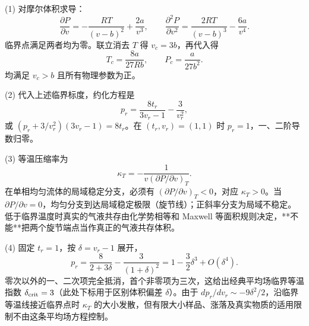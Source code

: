 (1) 对摩尔体积求导：
\[
\frac{\partial P}{\partial v}=-\frac{RT}{(v-b)^2}+\frac{2a}{v^3},\qquad
\frac{\partial^2P}{\partial v^2}=\frac{2RT}{(v-b)^3}-\frac{6a}{v^4}.
\]
临界点满足两者均为零。联立消去 \(T\) 得 \(v_c=3b\)，再代入得
\[
T_c=\frac{8a}{27Rb},\qquad P_c=\frac{a}{27b^2}.
\]
均满足 \(v_c>b\) 且所有物理参数为正。

(2) 代入上述临界标度，约化方程是
\[
p_r=\frac{8t_r}{3v_r-1}-\frac{3}{v_r^2},
\]
或 \((p_r+3/v_r^2)(3v_r-1)=8t_r\)。在 \((t_r,v_r)=(1,1)\) 时 \(p_r=1\)，一、二阶导数归零。

(3) 等温压缩率为
\[
\kappa_T=-\frac{1}{v(\partial P/\partial v)_T}.
\]
在单相均匀流体的局域稳定分支，必须有 \((\partial P/\partial v)_T<0\)，对应 \(\kappa_T>0\)。当 \(\partial P/\partial v=0\)，均匀分支到达局域稳定极限（旋节线）；正斜率分支为局域不稳定。低于临界温度时真实的气液共存由化学势相等和 Maxwell 等面积规则决定，**不能**把两个旋节端点当作真正的气液共存体积。

(4) 固定 \(t_r=1\)，按 \(\delta=v_r-1\) 展开，
\[
p_r=\frac8{2+3\delta}-\frac3{(1+\delta)^2}
=1-\frac32\delta^3+O(\delta^4).
\]
零次以外的一、二次项完全抵消，首个非零项为三次，这给出经典平均场临界等温指数 \(\delta_{\rm crit}=3\)（此处下标用于区别体积偏差 \(\delta\)）。由于 \(dp_r/dv_r\sim-9\delta^2/2\)，沿临界等温线接近临界点时 \(\kappa_T\) 的大小发散，但有限大小样品、涨落及真实物质的适用限制不由这条平均场方程控制。
